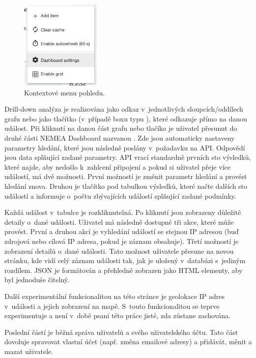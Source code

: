 \begin{figure}[ht]
    \centering
    \includegraphics[width=0.35\textwidth]{fig/dashboard_menu.png}
    \caption{Kontextové menu pohledu.} \label{fig:dashboard_menu}
\end{figure}

Drill-down analýza je realizována jako odkaz v~jednotlivých sloupcích/oddílech grafu nebo jako tlačítko (v~případě boxu typu ), které odkazuje přímo na danou událost. Při kliknutí na danou část grafu nebo tlačíko je uživatel přesunut do druhé části NEMEA Dashboard nazvanou . Zde jsou automaticky nastaveny parametry hledání, které jsou následně poslány v~požadavku na API. Odpovědí jsou data splňující zadané parametry. API vrací standardně prvních sto výsledků, které najde, aby nedošlo k~zahlcení připojení a pokud si uživatel přeje více událostí, má dvě možnosti. První možností je změnit parametr hledání a provést hledání znova.  Druhou je tlačítko pod tabulkou výsledků, které načte dalších sto událostí a informuje o~počtu zbývajících událostí splňující zadané podmínky.

Každá událost v~tabulce je rozkliknutelná. Po kliknutí jsou zobrazeny důležité detaily o~dané události. Uživatel má následně dostupné tři akce, které může provést. První a druhou akcí je vyhledání událostí se stejnou IP adresou (buď zdrojová nebo cílová IP adresa, pokud je záznam obsahuje). Třetí možností je zobrazení detailů o~dané události. Tato možnost uživatele přesune na novou stránku, kde vidí celý záznam události tak, jak je uložený v~databázi s~jediným rozdílem. JSON je formátován a přehledně zobrazen jako HTML elementy, aby byl jednoduše čitelný.

Další experimentální funkcionalitou na této stránce je geolokace IP adres v~události a jejich zobrazení na mapě. S~touto funkcionalitou se teprve experimentuje a není v~době psaní této práce jisté, zda zůstane zachována.

Poslední částí je běžná správa uživatelů a svého uživatelského účtu. Tato část dovoluje spravovat vlastní účet (např. změna emailové adresy) a přidávát, měnit a mazat uživatele.

